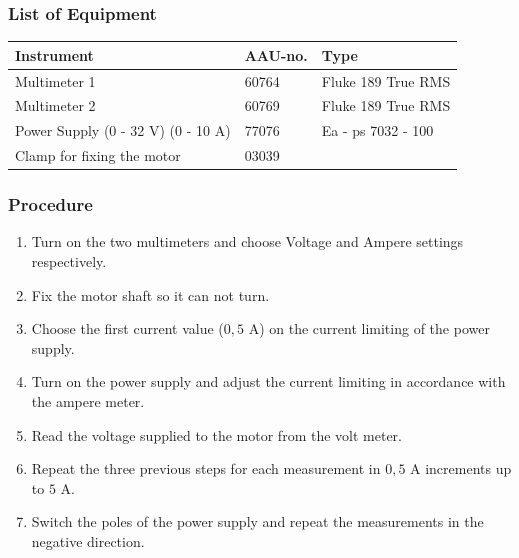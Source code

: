 \subsubsection{List of Equipment}
\begin{table}[H]
\begin{tabular}{|l|l|p{4cm}|}
\hline%
  \textbf{Instrument}                        &  \textbf{AAU-no.}  &  \textbf{Type}       \\
\hline%
  Multimeter 1                               &  60764             &  Fluke 189 True RMS  \\
\hline%
  Multimeter 2                   		         &  60769             &  Fluke 189 True RMS  \\
\hline%
  Power Supply \small{(0 - 32 V) (0 - 10 A)} &  77076             &  Ea - ps 7032 - 100  \\
\hline%
  Clamp for fixing the motor                 &  03039             &                      \\
\hline%
\end{tabular}
\end{table}

\subsubsection{Procedure}

\begin{enumerate}
  \item Turn on the two multimeters and choose Voltage and Ampere settings respectively.
  \item Fix the motor shaft so it can not turn.
  \item Choose the first current value ($0,5$ A) on the current limiting of the power supply.
  \item Turn on the power supply and adjust the current limiting in accordance with the ampere meter.
  \item Read the voltage supplied to the motor from the volt meter.
  \item Repeat the three previous steps for each measurement in $0,5$ A increments up to $5$ A.
  \item Switch the poles of the power supply and repeat the measurements in the negative direction.
\end{enumerate}

